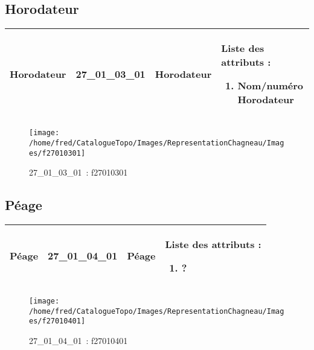 \documentclass[12pt,titlepage]{book}
\begin{document}
\subsection{Horodateur}
\noindent
\vspace{\baselineskip}

\renewcommand{\arraystretch}{1.2}
\begin{supertabular}{|p{10cm}|c|p{13cm}|p{12cm}|}
 Horodateur & 27\_01\_03\_01 & Horodateur & Liste des attributs :
\begin{enumerate}
  \item Nom/numéro Horodateur\end{enumerate}
\\
\hline
\end{supertabular}
\begin{figure}[h!]
  \hfill         %
  \begin{minipage}[t]{3cm}
    \begin{center}
      \texttt{[image: /home/fred/CatalogueTopo/Images/RepresentationChagneau/Images/f27010301]}
      \caption[~27\_01\_03\_01]{\small{27\_01\_03\_01~:} \tiny{f27010301}}\label{f27010301}
    \end{center}
  \end{minipage}
\end{figure}


\subsection{Péage}
\noindent
\vspace{\baselineskip}

\renewcommand{\arraystretch}{1.2}
\begin{supertabular}{|p{10cm}|c|p{13cm}|p{12cm}|}
 Péage & 27\_01\_04\_01 & Péage & Liste des attributs :
\begin{enumerate}
  \item ?\end{enumerate}
\\
\hline
\end{supertabular}
\begin{figure}[h!]
  \hfill         %
  \begin{minipage}[t]{3cm}
    \begin{center}
      \texttt{[image: /home/fred/CatalogueTopo/Images/RepresentationChagneau/Images/f27010401]}
      \caption[~27\_01\_04\_01]{\small{27\_01\_04\_01~:} \tiny{f27010401}}\label{f27010401}
    \end{center}
  \end{minipage}
\end{figure}
\end{document}
